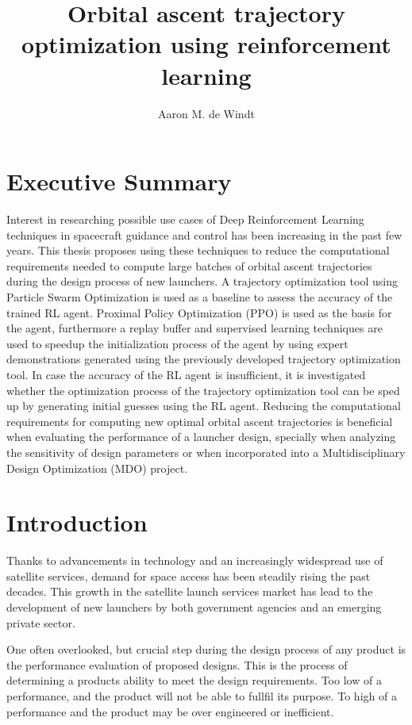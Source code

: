 \documentclass[12pt, english, NoHyper]{AE4010-template}
\title{Orbital ascent trajectory optimization using reinforcement learning}
\author{Aaron M. de Windt}
\begin{document}
\maketitle

\section*{Executive Summary}
Interest in researching possible use cases of Deep Reinforcement Learning techniques in spacecraft guidance and control has been increasing in the past few years. This thesis proposes using these techniques to reduce the computational requirements needed to compute large batches of orbital ascent trajectories during the design process of new launchers. A trajectory optimization tool using Particle Swarm Optimization is used as a baseline to assess the accuracy of the trained RL agent. Proximal Policy Optimization (PPO) is used as the basis for the agent, furthermore a replay buffer and supervised learning techniques are used to speedup the initialization process of the agent by using expert demonstrations generated using the previously developed trajectory optimization tool. In case the accuracy of the RL agent is insufficient, it is investigated whether the optimization process of the trajectory optimization tool can be sped up by generating initial guesses using the RL agent. Reducing the computational requirements for computing new optimal orbital ascent trajectories is beneficial when evaluating the performance of a launcher design, specially when analyzing the  sensitivity of design parameters or when incorporated into a Multidisciplinary Design Optimization (MDO) project.




\section{Introduction}
Thanks to advancements in technology and an increasingly widespread use of satellite services, demand for space access has been steadily rising the past decades. This growth in the satellite launch services market has lead to the development of new launchers by both government agencies and an emerging private sector. 

One often overlooked, but crucial step during the design process of any product is the performance evaluation of proposed designs. This is the process of determining a products ability to meet the design requirements. Too low of a performance, and the product will not be able to fullfil its purpose. To high of a performance and the product may be over engineered or inefficient.
\end{document}
